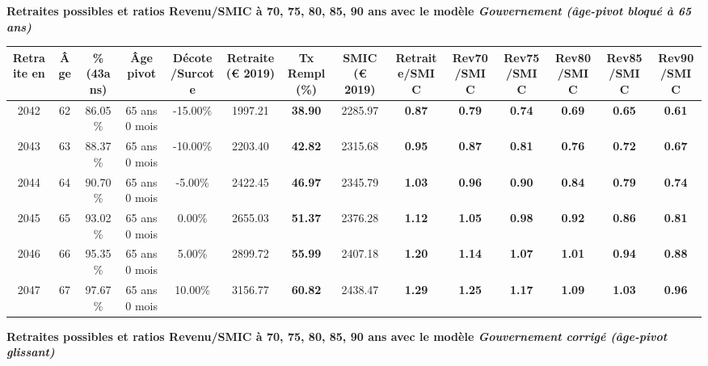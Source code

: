 {\bf \noindent Retraites possibles et ratios Revenu/SMIC à 70, 75, 80, 85, 90 ans avec le modèle \emph{Gouvernement (âge-pivot bloqué à 65 ans)}}  
 
\begin{adjustbox}{max width=\textwidth} 
\begin{tabular}[htb]{|c|c||c|c|c||c|c||c||c|c|c|c|c|c|} 
\hline 
 Retraite en &  Âge &  \%(43ans) &  Âge pivot &  Décote/Surcote &  Retraite (\euro{} 2019) &  Tx Rempl(\%) &  SMIC (\euro{} 2019) &  Retraite/SMIC &  Rev70/SMIC &  Rev75/SMIC &  Rev80/SMIC &  Rev85/SMIC &  Rev90/SMIC \\ 
\hline \hline 
 2042 &  62 &  86.05\% &  65 ans 0 mois &  -15.00\% &  1997.21 &  {\bf 38.90} &  2285.97 &  {\bf {\color{red} 0.87}} &  {\bf {\color{red} 0.79}} &  {\bf {\color{red} 0.74}} &  {\bf {\color{red} 0.69}} &  {\bf {\color{red} 0.65}} &  {\bf {\color{red} 0.61}} \\ 
\hline 
 2043 &  63 &  88.37\% &  65 ans 0 mois &  -10.00\% &  2203.40 &  {\bf 42.82} &  2315.68 &  {\bf {\color{red} 0.95}} &  {\bf {\color{red} 0.87}} &  {\bf {\color{red} 0.81}} &  {\bf {\color{red} 0.76}} &  {\bf {\color{red} 0.72}} &  {\bf {\color{red} 0.67}} \\ 
\hline 
 2044 &  64 &  90.70\% &  65 ans 0 mois &  -5.00\% &  2422.45 &  {\bf 46.97} &  2345.79 &  {\bf 1.03} &  {\bf {\color{red} 0.96}} &  {\bf {\color{red} 0.90}} &  {\bf {\color{red} 0.84}} &  {\bf {\color{red} 0.79}} &  {\bf {\color{red} 0.74}} \\ 
\hline 
 2045 &  65 &  93.02\% &  65 ans 0 mois &  0.00\% &  2655.03 &  {\bf 51.37} &  2376.28 &  {\bf 1.12} &  {\bf 1.05} &  {\bf {\color{red} 0.98}} &  {\bf {\color{red} 0.92}} &  {\bf {\color{red} 0.86}} &  {\bf {\color{red} 0.81}} \\ 
\hline 
 2046 &  66 &  95.35\% &  65 ans 0 mois &  5.00\% &  2899.72 &  {\bf 55.99} &  2407.18 &  {\bf 1.20} &  {\bf 1.14} &  {\bf 1.07} &  {\bf 1.01} &  {\bf {\color{red} 0.94}} &  {\bf {\color{red} 0.88}} \\ 
\hline 
 2047 &  67 &  97.67\% &  65 ans 0 mois &  10.00\% &  3156.77 &  {\bf 60.82} &  2438.47 &  {\bf 1.29} &  {\bf 1.25} &  {\bf 1.17} &  {\bf 1.09} &  {\bf 1.03} &  {\bf {\color{red} 0.96}} \\ 
\hline 
\hline 
\end{tabular} 
\end{adjustbox} 
 
 \vspace{0.1cm} 
{\bf \noindent Retraites possibles et ratios Revenu/SMIC à 70, 75, 80, 85, 90 ans avec le modèle \emph{Gouvernement corrigé (âge-pivot glissant)}}  
 
